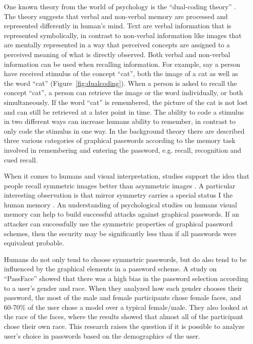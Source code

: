 	One known theory from the world of psychology is the ``dual-coding theory'' \cite{Biddle}. The theory suggests that verbal and non-verbal memory are processed and represented differently in human's mind. Text are verbal information that is represented symbolically, in contrast to non-verbal information like images that are mentally represented in a way that perceived concepts are assigned to a perceived meaning of what is directly observed. Both verbal and non-verbal information can be used when recalling information. For example, say a person have received stimulus of the concept ``cat'', both the image of a cat as well as the word ``cat'' (Figure~\ref{fig:dualcoding}). When a person is asked to recall the concept ``cat'', a person can retrieve the image or the word individually, or both simultaneously. If the word ``cat'' is remembered, the picture of the cat is not lost and can still be retrieved at a later point in time. The ability to code a stimulus in two different ways can increase humans ability to remember, in contrast to only code the stimulus in one way. In the background theory there are described three various categories of graphical passwords according to the memory task involved in remembering and entering the password, e.g. recall, recognition and cued recall.

	When it comes to humans and visual interpretation, studies support the idea that people recall symmetric images better than asymmetric images \cite{Attneave, French}. A particular interesting observation is that mirror symmetry carries a special status I the human memory \cite{Wagemans1}. An understanding of psychological studies on humans visual memory can help to build successful attacks against graphical passwords. If an attacker can successfully use the symmetric properties of graphical password schemes, then the security may be significantly less than if all passwords were equivalent probable.

  Humans do not only tend to choose symmetric passwords, but do also tend to be influenced by the graphical elements in a password scheme. A study on ``PassFace'' \cite{Davis} showed that there was a high bias in the password selection according to a user's gender and race. When they analyzed how each gender chooses their password, the most of the male and female participants chose female faces, and 60-70\% of the user chose a model over a typical female/male. They also looked at the race of the faces, where the results showed that almost all of the participant chose their own race. This research raises the question if it is possible to analyze user's choice in passwords based on the demographics of the user.

